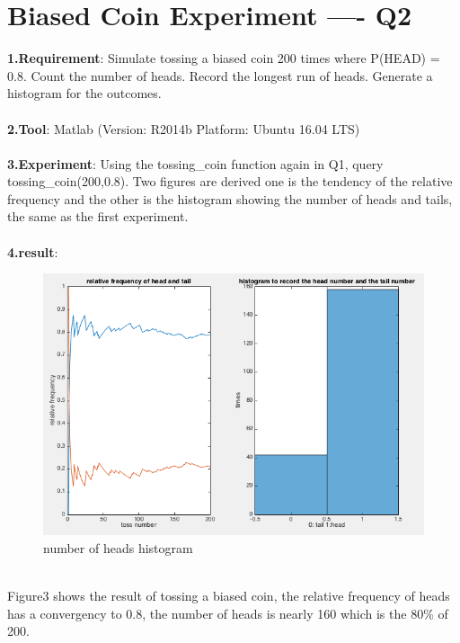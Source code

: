 \documentclass[twoside]{article}
\begin{document}
\section{Biased Coin Experiment ---- Q2}
\textbf{1.Requirement}: Simulate tossing a biased coin 200 times where P(HEAD) = 0.8. Count the number of heads. Record the longest run of heads. Generate a histogram for the outcomes.\\ \\
\textbf{2.Tool}: Matlab (Version: R2014b Platform: Ubuntu 16.04 LTS)\\ \\
\textbf{3.Experiment}: Using the tossing\_coin function again in Q1, query tossing\_coin(200,0.8). Two figures are derived one is the tendency of the relative frequency and the other is the histogram showing the number of heads and tails, the same as the first experiment.\\ \\
\textbf{4.result}:\\
\begin{figure}%
   \begin{center}
   \includegraphics[scale = 0.35]{../data/exp2.png}
   \end{center} 
   \caption{number of heads histogram} 
   \vspace{20pt} 
\end{figure}
\\
Figure3 shows the result of tossing a biased coin, the relative frequency of heads has a convergency to 0.8, the number of heads is nearly 160 which is the 80\% of 200.\\ \\ \\ \\
\end{document}
